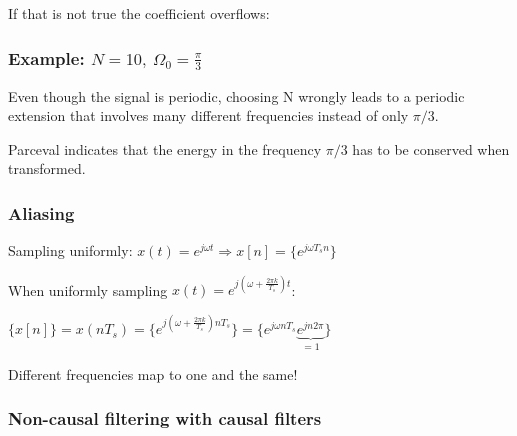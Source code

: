 \documentclass[7pt,a4paper]{scrartcl}
\begin{document}
\begin{multicols*}{4}


If that is not true the coefficient \glqq overflows\grqq:

\subsubsection*{Example: $N=10,\ \Omega_0=\frac{\pi}{3}$}


Even though the signal is periodic, choosing N wrongly leads to a periodic extension that involves many different frequencies instead of only $\pi/3$.

Parceval indicates that the energy in the frequency $\pi/3$ has to be conserved when transformed.

\subsubsection*{Aliasing}

Sampling uniformly: $x(t)=e^{j\omega t}\Rightarrow x[n]=\{e^{j\omega T_s n}\}$

When uniformly sampling $x(t)=e^{j(\omega+\frac{2\pi k}{T_s})t}$:

$\{x[n]\}={x(n T_s)}=\{e^{j(\omega+\frac{2\pi k}{T_s})n T_s}\}=\{e^{j\omega n T_s}\underbrace{e^{jn2\pi}}_{=1}\}$

\dahe Different frequencies map to one and the same!



\subsubsection*{Non-causal filtering with causal filters}



\end{multicols*}
\end{document}
